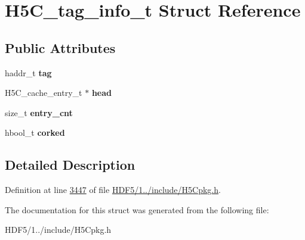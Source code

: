 \hypertarget{struct_h5_c__tag__info__t}{}\section{H5\+C\+\_\+tag\+\_\+info\+\_\+t Struct Reference}
\label{struct_h5_c__tag__info__t}
\subsection*{Public Attributes}
\begin{DoxyCompactItemize}
\item 
\mbox{\label{struct_h5_c__tag__info__t_a713b38731a7e941c63fcf5158006df7f}} 
haddr\+\_\+t {\bfseries tag}
\item 
\mbox{\label{struct_h5_c__tag__info__t_a3acd6a333c21ccc95558d45214399905}} 
H5\+C\+\_\+cache\+\_\+entry\+\_\+t $\ast$ {\bfseries head}
\item 
\mbox{\label{struct_h5_c__tag__info__t_a67cce076a6ee94ce10dac8d606ef8b07}} 
size\+\_\+t {\bfseries entry\+\_\+cnt}
\item 
\mbox{\label{struct_h5_c__tag__info__t_a0311b250a0fd39a847df46f0c256adcd}} 
hbool\+\_\+t {\bfseries corked}
\end{DoxyCompactItemize}


\subsection{Detailed Description}


Definition at line \hyperlink{_h_d_f5_21_810_81_2include_2_h5_cpkg_8h_source_l03447}{3447} of file \hyperlink{_h_d_f5_21_810_81_2include_2_h5_cpkg_8h_source}{H\+D\+F5/1../include/\+H5\+Cpkg.\+h}.



The documentation for this struct was generated from the following file\+:\begin{DoxyCompactItemize}
\item 
H\+D\+F5/1../include/\+H5\+Cpkg.\+h\end{DoxyCompactItemize}
